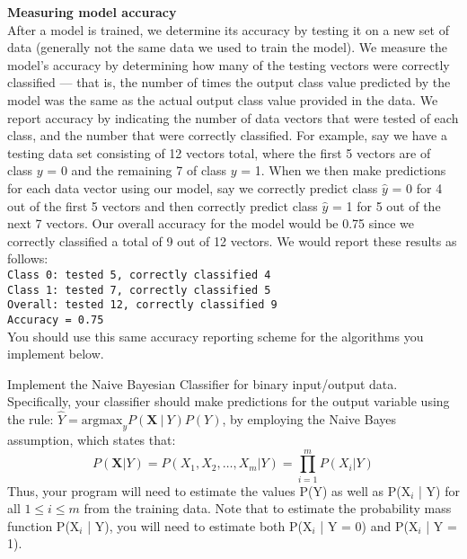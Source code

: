 \documentclass[12pt]{article}
\renewcommand{\(}{\left(}
\renewcommand{\)}{\right)}
\theoremstyle{definition}
\begin{document}
\begin{enumerate}
{{    \textbf{Measuring model accuracy}\\
    After a model is trained, we determine its accuracy by testing it on a new set of data (generally not the same data we used to train the model). We measure the model's accuracy by determining how many of the testing vectors were correctly classified --- that is, the number of times the output class value predicted by the model was the same as the actual output class value provided in the data. We report accuracy by indicating the number of data vectors that were tested of each class, and the number that were correctly classified. For example, say we have a testing data set consisting of 12 vectors total, where the first 5 vectors are of class $y$ = 0 and the remaining 7 of class $y$ = 1. When we then make predictions for each data vector using our model, say we correctly predict class $\hat{y}$ = 0 for 4 out of the first 5 vectors and then correctly predict class $\hat{y}$ = 1 for 5 out of the next 7 vectors. Our overall accuracy for the model would be 0.75 since we correctly classified a total of 9 out of 12 vectors. We would report these results as follows:\\
    \texttt{Class 0: tested 5, correctly classified 4\\
    Class 1: tested 7, correctly classified 5\\
    Overall: tested 12, correctly classified 9\\
    Accuracy = 0.75}\\
    You should use this same accuracy reporting scheme for the algorithms you implement below.}
    
    \large{
    \newpage
    \item Implement the Naive Bayesian Classifier for binary input/output data. Specifically, your classifier should make predictions for the output variable using the rule: $\hat{Y} = \text{argmax}_y P(\textbf{X}\ |\ Y)P(Y)$, by employing the Naive Bayes assumption, which states that:
    \[
    P(\textbf{X}|Y) = P(X_1, X_2, \ldots, X_m|Y) = \prod_{i=1}^m P(X_i|Y)
    \]
    Thus, your program will need to estimate the values P(Y) as well as P(X$_i$ | Y) for all $1 \leq i \leq m$ from the training data. Note that to estimate the probability mass function P(X$_i$ | Y), you will need to estimate both P(X$_i$ | Y = 0) and P(X$_i$ | Y = 1).
    
}}
\end{enumerate}
\end{document}
